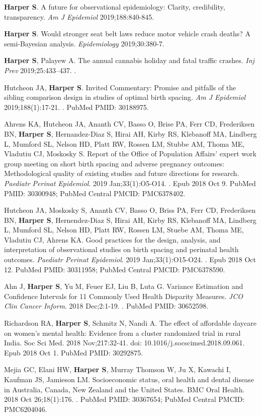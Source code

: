 \documentclass[
  letterpaper,
  DIV=11,
  numbers=noendperiod]{scrartcl}
\begin{document}
\textbf{Harper S}. A future for observational epidemiology: Clarity,
credibility, transparency. \emph{Am J Epidemiol} 2019;188:840-845.

\textbf{Harper S}. Would stronger seat belt laws reduce motor vehicle
crash deaths? A semi-Bayesian analysis. \emph{Epidemiology}
2019;30:380-7.

\textbf{Harper S}, Palayew A. The annual cannabis holiday and fatal
traffic crashes. \emph{Inj Prev} 2019;25:433--437. .

Hutcheon JA, \textbf{Harper S}. Invited Commentary: Promise and pitfalls
of the sibling comparison design in studies of optimal birth spacing.
\emph{Am J Epidemiol} 2019;188(1):17-21. . PubMed PMID: 30188975.

Ahrens KA, Hutcheon JA, Ananth CV, Basso O, Brise PA, Ferr CD,
Frederiksen BN, \textbf{Harper S}, Hernandez-Diaz S, Hirai AH, Kirby RS,
Klebanoff MA, Lindberg L, Mumford SL, Nelson HD, Platt RW, Rossen LM,
Stubbe AM, Thoma ME, Vladutiu CJ, Moskosky S. Report of the Office of
Population Affairs' expert work group meeting on short birth spacing and
adverse pregnancy outcomes: Methodological quality of existing studies
and future directions for research. \emph{Paediatr Perinat Epidemiol}.
2019 Jan;33(1):O5-O14. . Epub 2018 Oct 9. PubMed PMID: 30300948; PubMed
Central PMCID: PMC6378402.

Hutcheon JA, Moskosky S, Ananth CV, Basso O, Briss PA, Ferr CD,
Frederiksen BN, \textbf{Harper S}, Hernendez-Diaz S, Hirai AH, Kirby RS,
Klebanoff MA, Lindberg L, Mumford SL, Nelson HD, Platt RW, Rossen LM,
Stuebe AM, Thoma ME, Vladutiu CJ, Ahrens KA. Good practices for the
design, analysis, and interpretation of observational studies on birth
spacing and perinatal health outcomes. \emph{Paediatr Perinat
Epidemiol}. 2019 Jan;33(1):O15-O24. . Epub 2018 Oct 12. PubMed PMID:
30311958; PubMed Central PMCID: PMC6378590.

Ahn J, \textbf{Harper S}, Yu M, Feuer EJ, Liu B, Luta G. Variance
Estimation and Confidence Intervals for 11 Commonly Used Health
Disparity Measures. \emph{JCO Clin Cancer Inform}. 2018 Dec;2:1-19. .
PubMed PMID: 30652598.

Richardson RA, \textbf{Harper S}, Schmitz N, Nandi A. The effect of
affordable daycare on women's mental health: Evidence from a cluster
randomized trial in rural India. Soc Sci Med. 2018 Nov;217:32-41. doi:
10.1016/j.socscimed.2018.09.061. Epub 2018 Oct 1. PubMed PMID: 30292875.

Mejia GC, Elani HW, \textbf{Harper S}, Murray Thomson W, Ju X, Kawachi
I, Kaufman JS, Jamieson LM. Socioeconomic status, oral health and dental
disease in Australia, Canada, New Zealand and the United States. BMC
Oral Health. 2018 Oct 26;18(1):176. . PubMed PMID: 30367654; PubMed
Central PMCID: PMC6204046.
\end{document}
